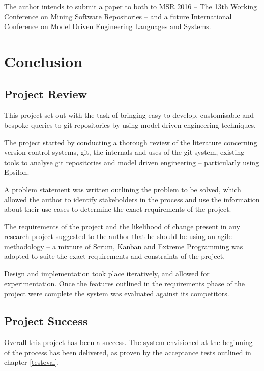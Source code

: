 \documentclass[11pt]{book}
\begin{document}
The author intends to submit a paper to both to MSR 2016 -- The 13th Working Conference on Mining Software Repositories \cite{msr2016} -- and a future International Conference on Model Driven Engineering Languages and Systems.


\chapter{Conclusion}
\section{Project Review}
This project set out with the task of bringing easy to develop, customisable and bespoke queries to git repositories by using model-driven engineering techniques. 

The project started by conducting a thorough review of the literature concerning version control systems, git, the internals and uses of the git system, existing tools to analyse git repositories and model driven engineering -- particularly using Epsilon.

A problem statement was written outlining the problem to be solved, which allowed the author to identify stakeholders in the process and use the information about their use cases to determine the exact requirements of the project.

The requirements of the project and the likelihood of change present in any research project suggested to the author that he should be using an agile methodology -- a mixture of Scrum, Kanban and Extreme Programming was adopted to suite the exact requirements and constraints of the project.

Design and implementation took place iteratively, and allowed for experimentation. Once the features outlined in the requirements phase of the project were complete the system was evaluated against its competitors.

\section{Project Success}
Overall this project has been a success. The system envisioned at the beginning of the process has been delivered, as proven by the acceptance tests outlined in chapter \ref{testeval}.
\end{document}
